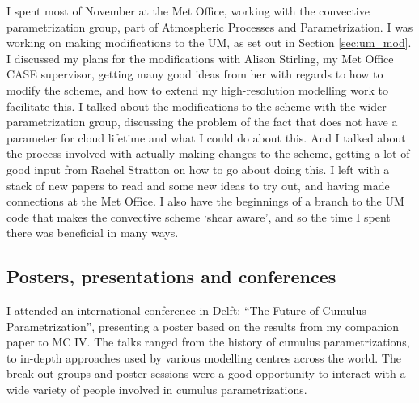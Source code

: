 \documentclass[11pt,a4paper]{article}
\begin{document}
I spent most of November at the Met Office, working with the convective parametrization group, part of Atmospheric Processes and Parametrization. I was working on making modifications to the UM, as set out in Section \ref{sec:um_mod}. I discussed my plans for the modifications with Alison Stirling, my Met Office CASE supervisor, getting many good ideas from her with regards to how to modify the scheme, and how to extend my high-resolution modelling work to facilitate this. I talked about the modifications to the scheme with the wider parametrization group, discussing the problem of the fact that \cite{gregory1990mass} does not have a parameter for cloud lifetime and what I could do about this. And I talked about the process involved with actually making changes to the scheme, getting a lot of good input from Rachel Stratton on how to go about doing this. I left with a stack of new papers to read and some new ideas to try out, and having made connections at the Met Office. I also have the beginnings of a branch to the UM code that makes the convective scheme `shear aware', and so the time I spent there was beneficial in many ways.

\subsection{Posters, presentations and conferences}
\label{sec:presentations}

I attended an international conference in Delft: ``The Future of Cumulus Parametrization'', presenting a poster based on the results from my companion paper to MC IV. The talks ranged from the history of cumulus parametrizations, to in-depth approaches used by various modelling centres across the world. 
The break-out groups and poster sessions were a good opportunity to interact with a wide variety of people involved in cumulus parametrizations.
\end{document}
